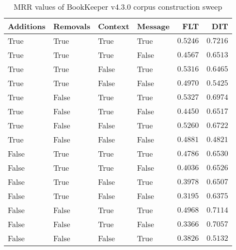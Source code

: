 
\begin{table}
\begin{spacing}{1.2}
\centering
\caption{MRR values of BookKeeper v4.3.0 corpus construction sweep}
\label{table:bookkeeper_corpus_sweep}
\vspace{0.2em}
\begin{tabular}{llll|rr}
\toprule
Additions & Removals & Context & Message & FLT &        DIT \\
\midrule
     True &     True &    True &    True &         $0.5246$ & $\bm{0.7216}$ \\
     True &     True &    True &   False &         $0.4567$ &      $0.6513$ \\
     True &     True &   False &    True &         $0.5316$ &      $0.6465$ \\
     True &     True &   False &   False &         $0.4970$ &      $0.5425$ \\
     True &    False &    True &    True &    $\bm{0.5327}$ &      $0.6974$ \\
     True &    False &    True &   False &         $0.4450$ &      $0.6517$ \\
     True &    False &   False &    True &         $0.5260$ &      $0.6722$ \\
     True &    False &   False &   False &         $0.4881$ &      $0.4821$ \\
    False &     True &    True &    True &         $0.4786$ &      $0.6530$ \\
    False &     True &    True &   False &         $0.4036$ &      $0.6526$ \\
    False &     True &   False &    True &         $0.3978$ &      $0.6507$ \\
    False &     True &   False &   False &         $0.3195$ &      $0.6375$ \\
    False &    False &    True &    True &         $0.4968$ &      $0.7114$ \\
    False &    False &    True &   False &         $0.3366$ &      $0.7057$ \\
    False &    False &   False &    True &         $0.3826$ &      $0.5132$ \\
\bottomrule
\end{tabular}

\end{spacing}
\end{table}
